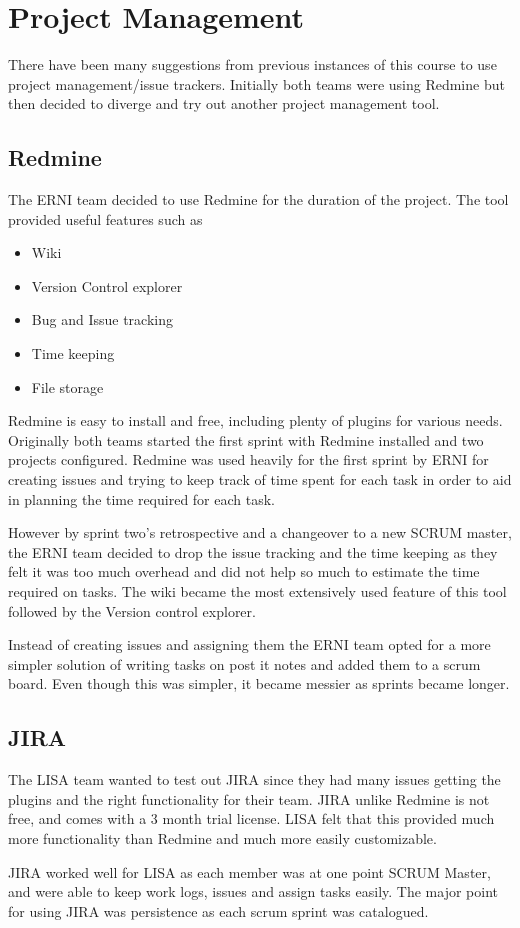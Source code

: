 \section{Project Management}

There have been many suggestions from previous instances of this course to use project management/issue trackers. Initially both teams were using Redmine but then decided to diverge and try out another project management tool. 

\subsection{Redmine}

The ERNI team decided to use Redmine for the duration of the project. The tool provided useful features such as
\begin{itemize}
\item Wiki
\item Version Control explorer
\item Bug and Issue tracking
\item Time keeping
\item File storage
\end{itemize} 

Redmine is easy to install and free, including plenty of plugins for various needs. Originally both teams started the first sprint with Redmine installed and two projects configured. Redmine was used heavily for the first sprint by ERNI for creating issues and trying to keep track of time spent for each task in order to aid in planning the time required for each task. 

However by sprint two's retrospective and a changeover to a new SCRUM master, the ERNI team decided to drop the issue tracking and the time keeping as they felt it was too much overhead and did not help so much to estimate the time required on tasks. The wiki became the most extensively used feature of this tool followed by the Version control explorer. 

Instead of creating issues and assigning them the ERNI team opted for a more simpler solution of writing tasks on post it notes and added them to a scrum board. Even though this was simpler, it became messier as sprints became longer.

\subsection{JIRA}

The LISA team wanted to test out JIRA since they had many issues getting the plugins and the right functionality for their team. JIRA unlike Redmine is not free, and comes with a 3 month trial license. LISA felt that this provided much more functionality than Redmine and much more easily customizable.

JIRA worked well for LISA as each member was at one point SCRUM Master, and were able to keep work logs, issues and assign tasks easily. The major point for using JIRA was persistence as each scrum sprint was catalogued.